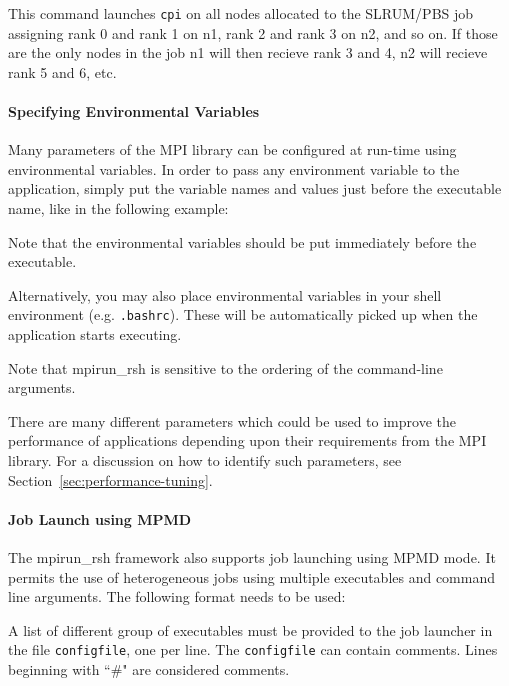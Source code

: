
This command launches \texttt{cpi} on all nodes allocated to the SLRUM/PBS
job assigning rank 0 and rank 1 on n1, rank 2 and rank 3 on n2, and so on.
If those are the only nodes in the job n1 will then recieve rank 3 and 4, 
n2 will recieve rank 5 and 6, etc.  


\paragraph{Specifying Environmental Variables\\}
Many parameters of the MPI library can be configured at
run-time using environmental variables. In order to pass any environment
variable to the application, simply put the variable names and values
just before the executable name, like in the following example:


Note that the environmental variables should be put immediately
before the executable.

Alternatively, you may also place environmental variables in your shell
environment (e.g. \texttt{.bashrc}). These will be automatically picked
up when the application starts executing.

Note that mpirun\_rsh is sensitive to the ordering of the command-line
arguments.

There are many different parameters which could be used
to improve the performance of applications depending upon their
requirements from the MPI library. For a discussion on how to identify
such parameters, see Section~\ref{sec:performance-tuning}.

\paragraph{Job Launch using MPMD\\}
The mpirun\_rsh framework also supports job launching
using MPMD mode.
It permits the use of heterogeneous jobs using
multiple executables and command line arguments.
The following format needs to be used:


A list of different group of executables must be provided to
the job launcher
in the file \texttt{configfile}, one per line. The \texttt{configfile}
can contain comments. Lines beginning with ``\#" are considered comments.

